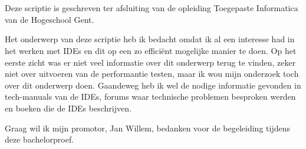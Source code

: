 
\chapter*{}
\label{ch:voorwoord}


Deze scriptie is geschreven ter afsluiting van de opleiding Toegepaste Informatica van
de Hogeschool Gent.

Het onderwerp van deze scriptie heb ik bedacht omdat ik al een interesse had in het werken met IDEs en dit op een zo efficiënt mogelijke manier te doen. Op het eerste zicht was er niet veel informatie over dit onderwerp terug te vinden, zeker niet over uitvoeren van de performantie testen, maar ik wou mijn onderzoek toch over dit onderwerp doen. Gaandeweg heb ik wel de nodige informatie gevonden in tech-manuals van de IDEs, forums waar technische problemen besproken werden en boeken die de IDEs beschrijven.

Graag wil ik mijn promotor, Jan Willem, bedanken voor de begeleiding tijdens
deze bachelorproef.